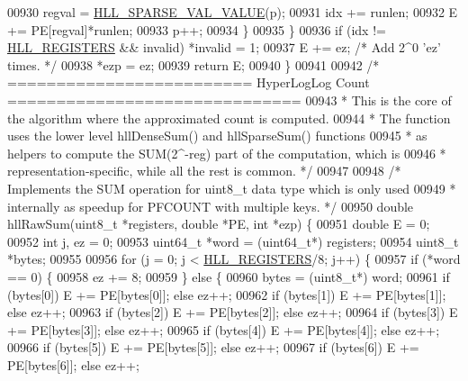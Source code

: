 \begin{DoxyCode}
{{00930             regval = \hyperlink{hyperloglog_8c_ad36de263468a9ce3b1409743b8da64d7}{HLL\_SPARSE\_VAL\_VALUE}(p);
00931             idx += runlen;
00932             E += PE[regval]*runlen;
00933             p++;
00934         \}
00935     \}
00936     \textcolor{keywordflow}{if} (idx != \hyperlink{hyperloglog_8c_aa053beb90136828dcb46545c7445fc36}{HLL\_REGISTERS} && invalid) *invalid = 1;
00937     E += ez; \textcolor{comment}{/* Add 2^0 'ez' times. */}
00938     *ezp = ez;
00939     \textcolor{keywordflow}{return} E;
00940 \}
00941 
00942 \textcolor{comment}{/* ========================= HyperLogLog Count ==============================}
00943 \textcolor{comment}{ * This is the core of the algorithm where the approximated count is computed.}
00944 \textcolor{comment}{ * The function uses the lower level hllDenseSum() and hllSparseSum() functions}
00945 \textcolor{comment}{ * as helpers to compute the SUM(2^-reg) part of the computation, which is}
00946 \textcolor{comment}{ * representation-specific, while all the rest is common. */}
00947 
00948 \textcolor{comment}{/* Implements the SUM operation for uint8\_t data type which is only used}
00949 \textcolor{comment}{ * internally as speedup for PFCOUNT with multiple keys. */}
00950 \textcolor{keywordtype}{double} hllRawSum(uint8\_t *registers, \textcolor{keywordtype}{double} *PE, \textcolor{keywordtype}{int} *ezp) \{
00951     \textcolor{keywordtype}{double} E = 0;
00952     \textcolor{keywordtype}{int} j, ez = 0;
00953     uint64\_t *word = (uint64\_t*) registers;
00954     uint8\_t *bytes;
00955 
00956     \textcolor{keywordflow}{for} (j = 0; j < \hyperlink{hyperloglog_8c_aa053beb90136828dcb46545c7445fc36}{HLL\_REGISTERS}/8; j++) \{
00957         \textcolor{keywordflow}{if} (*word == 0) \{
00958             ez += 8;
00959         \} \textcolor{keywordflow}{else} \{
00960             bytes = (uint8\_t*) word;
00961             \textcolor{keywordflow}{if} (bytes[0]) E += PE[bytes[0]]; \textcolor{keywordflow}{else} ez++;
00962             \textcolor{keywordflow}{if} (bytes[1]) E += PE[bytes[1]]; \textcolor{keywordflow}{else} ez++;
00963             \textcolor{keywordflow}{if} (bytes[2]) E += PE[bytes[2]]; \textcolor{keywordflow}{else} ez++;
00964             \textcolor{keywordflow}{if} (bytes[3]) E += PE[bytes[3]]; \textcolor{keywordflow}{else} ez++;
00965             \textcolor{keywordflow}{if} (bytes[4]) E += PE[bytes[4]]; \textcolor{keywordflow}{else} ez++;
00966             \textcolor{keywordflow}{if} (bytes[5]) E += PE[bytes[5]]; \textcolor{keywordflow}{else} ez++;
00967             \textcolor{keywordflow}{if} (bytes[6]) E += PE[bytes[6]]; \textcolor{keywordflow}{else} ez++;
}}
\end{DoxyCode}
